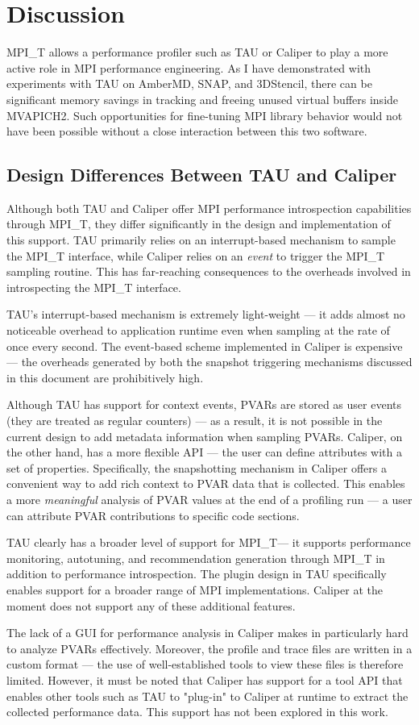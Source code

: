 \chapter{Discussion}

MPI\_T allows a performance profiler such as TAU or Caliper to play a more active role in MPI performance engineering. As I have demonstrated with experiments with TAU on AmberMD, SNAP, and 3DStencil, there can be significant memory savings in tracking and freeing unused virtual buffers inside MVAPICH2. Such opportunities for fine-tuning MPI library behavior would not have been possible without a close interaction between this two software.
\section{Design Differences Between TAU and Caliper}
\par Although both TAU and Caliper offer MPI performance introspection capabilities through MPI\_T, they differ significantly in the design and implementation of this support. TAU primarily relies on an interrupt-based mechanism to sample the MPI\_T interface, while Caliper relies on an \textit{event} to trigger the MPI\_T sampling routine. This has far-reaching consequences to the overheads involved in introspecting the MPI\_T interface. 
\par TAU's interrupt-based mechanism is extremely light-weight --- it adds almost no noticeable overhead to application runtime even when sampling at the rate of once every second. The event-based scheme implemented in Caliper is expensive --- the overheads generated by both the snapshot triggering mechanisms discussed in this document are prohibitively high. 
\par Although TAU has support for context events, PVARs are stored as user events (they are treated as regular counters) --- as a result, it is not possible in the current design to add metadata information when sampling PVARs. Caliper, on the other hand, has a more flexible API --- the user can define attributes with a set of properties. Specifically, the snapshotting mechanism in Caliper offers a convenient way to add rich context to PVAR data that is collected. This enables a more \textit{meaningful} analysis of PVAR values at the end of a profiling run --- a user can attribute PVAR contributions to specific code sections.
\par TAU clearly has a broader level of support for MPI\_T--- it supports performance monitoring, autotuning, and recommendation generation through MPI\_T in addition to performance introspection. The plugin design in TAU specifically enables support for a broader range of MPI implementations. Caliper at the moment does not support any of these additional features. 
\par The lack of a GUI for performance analysis in Caliper makes in particularly hard to analyze PVARs effectively. Moreover, the profile and trace files are written in a custom format --- the use of well-established tools to view these files is therefore limited. However, it must be noted that Caliper has support for a tool API that enables other tools such as TAU to "plug-in" to Caliper at runtime to extract the collected performance data. This support has not been explored in this work.
